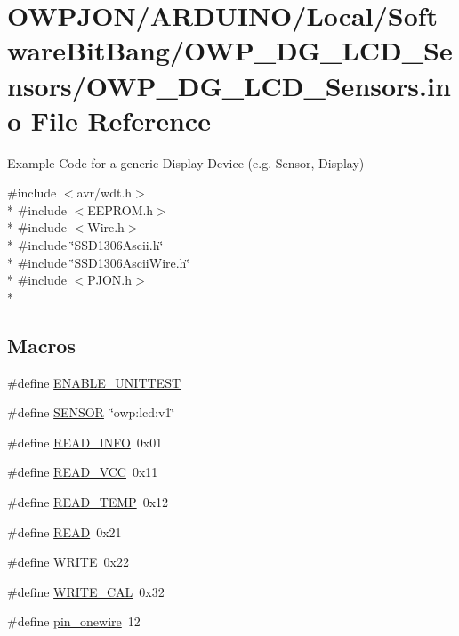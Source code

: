 \hypertarget{OWP__DG__LCD__Sensors_8ino}{\section{O\-W\-P\-J\-O\-N/\-A\-R\-D\-U\-I\-N\-O/\-Local/\-Software\-Bit\-Bang/\-O\-W\-P\-\_\-\-D\-G\-\_\-\-L\-C\-D\-\_\-\-Sensors/\-O\-W\-P\-\_\-\-D\-G\-\_\-\-L\-C\-D\-\_\-\-Sensors.ino File Reference}
\label{OWP__DG__LCD__Sensors_8ino}
}


Example-\/\-Code for a generic Display Device (e.\-g. Sensor, Display)  


{\ttfamily \#include $<$avr/wdt.\-h$>$}\\*
{\ttfamily \#include $<$E\-E\-P\-R\-O\-M.\-h$>$}\\*
{\ttfamily \#include $<$Wire.\-h$>$}\\*
{\ttfamily \#include \char`\"{}S\-S\-D1306\-Ascii.\-h\char`\"{}}\\*
{\ttfamily \#include \char`\"{}S\-S\-D1306\-Ascii\-Wire.\-h\char`\"{}}\\*
{\ttfamily \#include $<$P\-J\-O\-N.\-h$>$}\\*
\subsection*{Macros}
\begin{DoxyCompactItemize}
\item 
\#define \hyperlink{OWP__DG__LCD__Sensors_8ino_a133432ca7ece04b33429e0fb94544867}{E\-N\-A\-B\-L\-E\-\_\-\-U\-N\-I\-T\-T\-E\-S\-T}
\item 
\#define \hyperlink{OWP__DG__LCD__Sensors_8ino_a84f1ead330bbcc83a63929c4726080d7}{S\-E\-N\-S\-O\-R}~\char`\"{}owp\-:lcd\-:v1\char`\"{}
\item 
\#define \hyperlink{OWP__DG__LCD__Sensors_8ino_ae9d85efda88bdfdba5ca9fe92f557dd9}{R\-E\-A\-D\-\_\-\-I\-N\-F\-O}~0x01
\item 
\#define \hyperlink{OWP__DG__LCD__Sensors_8ino_a3563b296d5f60635a1256e8a12261d74}{R\-E\-A\-D\-\_\-\-V\-C\-C}~0x11
\item 
\#define \hyperlink{OWP__DG__LCD__Sensors_8ino_ac8c23082885adeec4834469b64e00bb9}{R\-E\-A\-D\-\_\-\-T\-E\-M\-P}~0x12
\item 
\#define \hyperlink{OWP__DG__LCD__Sensors_8ino_ada74e7db007a68e763f20c17f2985356}{R\-E\-A\-D}~0x21
\item 
\#define \hyperlink{OWP__DG__LCD__Sensors_8ino_aa10f470e996d0f51210d24f442d25e1e}{W\-R\-I\-T\-E}~0x22
\item 
\#define \hyperlink{OWP__DG__LCD__Sensors_8ino_a9418b096dba157494f523dc01b82a760}{W\-R\-I\-T\-E\-\_\-\-C\-A\-L}~0x32
\item 
\#define \hyperlink{OWP__DG__LCD__Sensors_8ino_a97cbb3ad861da749fa03cd51262660ca}{pin\-\_\-onewire}~12
\end{DoxyCompactItemize}
